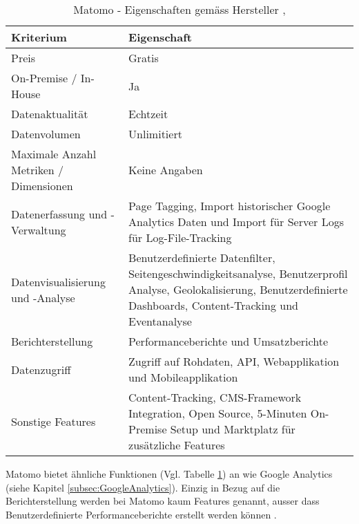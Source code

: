 \begin{table}[h]
	\centering
	\begin{tabular}{ | p{4cm} | p{10cm} |}
		\hline
		\textbf{Kriterium} & \textbf{Eigenschaft}  \\ 
		\hline
    Preis & Gratis \\
    \hline
    On-Premise / In-House & Ja \\
    \hline
    Datenaktualität & Echtzeit \\
    \hline
		Datenvolumen & Unlimitiert \\
    \hline
    Maximale Anzahl Metriken / Dimensionen & Keine Angaben \\
    \hline
		Datenerfassung und -Verwaltung & Page Tagging, Import historischer Google Analytics Daten und Import für Server Logs für Log-File-Tracking \\
    \hline
    Datenvisualisierung und -Analyse & Benutzerdefinierte Datenfilter, Seitengeschwindigkeitsanalyse, Benutzerprofil Analyse,  Geolokalisierung, Benutzerdefinierte Dashboards, Content-Tracking und Eventanalyse \\
    \hline
    Berichterstellung & Performanceberichte und Umsatzberichte \\
    \hline
    Datenzugriff & Zugriff auf Rohdaten, API, Webapplikation und Mobileapplikation \\
    \hline
    Sonstige Features & Content-Tracking, CMS-Framework Integration, Open Source, 5-Minuten On-Premise Setup und Marktplatz für zusätzliche Features \\
		\hline  
	\end{tabular}
	\caption{Matomo - Eigenschaften gemäss Hersteller \parencite{MamotoCloudVsOnPremise}, \parencite{MamotoFeatures}}
	\label{tab: MatomoFeatures}
\end{table}

Matomo bietet ähnliche Funktionen (Vgl. Tabelle \ref{tab: MatomoFeatures}) an wie Google Analytics (siehe Kapitel \ref{subsec:GoogleAnalytics}). Einzig in Bezug auf die Berichterstellung werden bei Matomo kaum Features genannt, ausser dass Benutzerdefinierte Performanceberichte erstellt werden können \parencite{MamotoFeatures}. 

